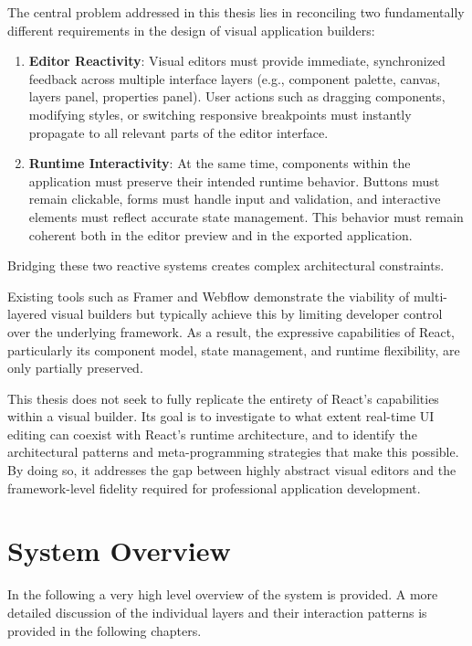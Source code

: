 \documentclass[oneside,12pt]{book}
\begin{document}
The central problem addressed in this thesis lies in reconciling two fundamentally different requirements in the design of visual application builders:

\begin{enumerate}
  \item \textbf{Editor Reactivity}: Visual editors must provide immediate, synchronized feedback across multiple interface layers (e.g., component palette, canvas, layers panel, properties panel). User actions such as dragging components, modifying styles, or switching responsive breakpoints must instantly propagate to all relevant parts of the editor interface.
  \item \textbf{Runtime Interactivity}: At the same time, components within the application must preserve their intended runtime behavior. Buttons must remain clickable, forms must handle input and validation, and interactive elements must reflect accurate state management. This behavior must remain coherent both in the editor preview and in the exported application.
\end{enumerate}

Bridging these two reactive systems creates complex architectural constraints. 

Existing tools such as Framer and Webflow demonstrate the viability of multi-layered visual builders but typically achieve this by limiting developer control over the underlying framework. As a result, the expressive capabilities of React, particularly its component model, state management, and runtime flexibility, are only partially preserved.

This thesis does not seek to fully replicate the entirety of React's capabilities within a visual builder. Its goal is to investigate to what extent real-time UI editing can coexist with React's runtime architecture, and to identify the architectural patterns and meta-programming strategies that make this possible. By doing so, it addresses the gap between highly abstract visual editors and the framework-level fidelity required for professional application development.

\section{System Overview}
\label{sec:system-overview}

In the following a very high level overview of the system is provided. A more detailed discussion of the individual layers and their interaction patterns is provided in the following chapters.
\end{document}
